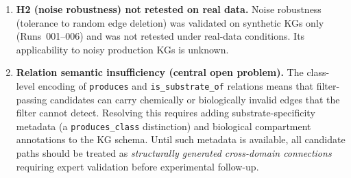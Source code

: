 \begin{enumerate}[leftmargin=*, label=\textbf{L\arabic*.}]
\item \textbf{H2 (noise robustness) not retested on real data.}
Noise robustness (tolerance to random edge deletion) was validated on synthetic
KGs only (Runs~001--006) and was not retested under real-data conditions.
Its applicability to noisy production KGs is unknown.

\item \textbf{Relation semantic insufficiency (central open problem).}
The class-level encoding of \texttt{produces} and \texttt{is\_substrate\_of}
relations means that filter-passing candidates can carry chemically or
biologically invalid edges that the filter cannot detect.
Resolving this requires adding substrate-specificity metadata (a
\texttt{produces\_class} distinction) and biological compartment annotations
to the KG schema.
Until such metadata is available, all candidate paths should be treated as
\textit{structurally generated cross-domain connections} requiring expert
validation before experimental follow-up.

\end{enumerate}
